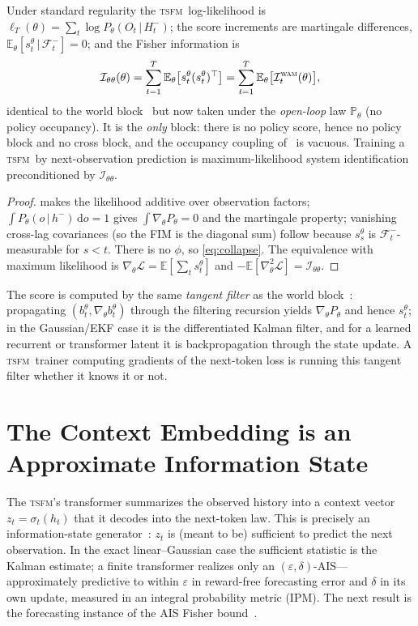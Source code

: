 \documentclass[10pt]{article}
\theoremstyle{plain}
\theoremstyle{definition}
\theoremstyle{remark}
\newcommand{\E}{\mathbb{E}}
\newcommand{\Prob}{\mathbb{P}}
\newcommand{\Fisher}{\mathcal{I}}
\newcommand{\Ith}{\Fisher_{\theta\theta}}
\newcommand{\given}{\,\vert\,}
\newcommand{\gth}{\nabla_{\theta}}
\newcommand{\wm}{P_{\theta}}
\newcommand{\eps}{\varepsilon}
\newcommand{\TSFM}{\textsc{tsfm}}
\newcommand{\WAM}{\textsc{wam}}
\begin{document}
\begin{proposition}\label{prop:tsfmwam}
Under standard regularity the \TSFM\ log-likelihood is
$\ell_T(\theta)=\sum_t\log\wm(O_t\given H_t^-)$; the score increments are
martingale differences, $\E_\theta[s_t^\theta\given\mathcal F_t^-]=0$; and the
Fisher information is
\begin{equation}
 \Ith(\theta)=\sum_{t=1}^T\E_\theta\big[s_t^\theta(s_t^\theta)^\top\big]
 =\sum_{t=1}^T\E_\theta\big[\Fisher_t^{\WAM}(\theta)\big],
 \label{eq:tsfmfim}
\end{equation}
identical to the world block~\cite[Prop.~4.1]{wamvla} but now taken under the
\emph{open-loop} law $\Prob_\theta$ (no policy occupancy). It is the \emph{only}
block: there is no policy score, hence no policy block and no cross block, and
the occupancy coupling of~\cite[Prop.~6.3]{wamvla} is vacuous. Training a \TSFM\
by next-observation prediction is maximum-likelihood system identification
preconditioned by $\Ith$.
\end{proposition}
\begin{proof}
 makes the likelihood additive over observation factors;
$\int\wm(o\given h^-)\,\mathrm do=1$ gives $\int\gth\wm=0$ and the martingale
property; vanishing cross-lag covariances (so the FIM is the diagonal sum) follow
because $s_s^\theta$ is $\mathcal F_t^-$-measurable for $s<t$. There is no
$\phi$, so \eqref{eq:collapse}. The equivalence with maximum likelihood is
$\gth\mathcal L=\E[\sum_t s_t^\theta]$ and $-\E[\nabla_\theta^2\mathcal
L]=\Ith$.
\end{proof}

The score is computed by the same \emph{tangent filter} as the world
block~\cite[\S4.1]{wamvla}: propagating $(b_t^\theta,\gth b_t^\theta)$ through
the filtering recursion yields $\gth\wm$ and hence $s_t^\theta$; in the
Gaussian/EKF case it is the differentiated Kalman filter, and for a learned
recurrent or transformer latent it is backpropagation through the state update.
A \TSFM\ trainer computing gradients of the next-token loss is running this
tangent filter whether it knows it or not.

\section{The Context Embedding is an Approximate Information State}
\label{sec:ais}

The \TSFM's transformer summarizes the observed history into a
context vector $z_t=\sigma_t(h_t)$ that it decodes into the next-token law. This
is precisely an information-state generator~\cite{ais2022}: $z_t$ is (meant to
be) sufficient to predict the next observation. In the exact linear--Gaussian
case the sufficient statistic is the Kalman estimate; a finite transformer
realizes only an $(\eps,\delta)$-AIS---approximately predictive to within
$\eps$ in reward-free forecasting error and $\delta$ in its own update, measured
in an integral probability metric (IPM). The next result is the forecasting
instance of the AIS Fisher bound~\cite[Thm.~7.2]{wamvla}.
\end{document}
